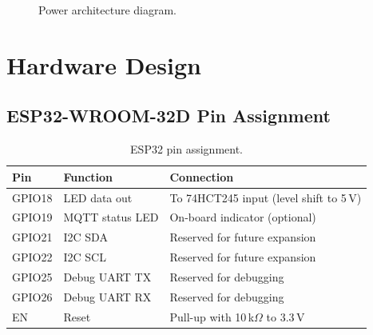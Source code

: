 \begin{figure}[H]
  \centering
  \caption{Power architecture diagram.}
  \label{fig:power-arch}
\end{figure}

\section{Hardware Design}
\label{sec:hw-design}

\subsection{ESP32-WROOM-32D Pin Assignment}
\label{sec:pin-assignment}

\begin{table}[H]
  \centering
  \caption{ESP32 pin assignment.}
  \label{tab:pins}
  \begin{tabular}{p{2cm} p{3cm} p{6cm}}
    \toprule
    \textbf{Pin} & \textbf{Function} & \textbf{Connection} \\
    \midrule
    GPIO18 & LED data out & To 74HCT245 input (level shift to 5\,V) \\
    GPIO19 & MQTT status LED & On-board indicator (optional) \\
    GPIO21 & I2C SDA & Reserved for future expansion \\
    GPIO22 & I2C SCL & Reserved for future expansion \\
    GPIO25 & Debug UART TX & Reserved for debugging \\
    GPIO26 & Debug UART RX & Reserved for debugging \\
    EN & Reset & Pull-up with 10\,k$\Omega$ to 3.3\,V \\
    \bottomrule
  \end{tabular}
\end{table}


